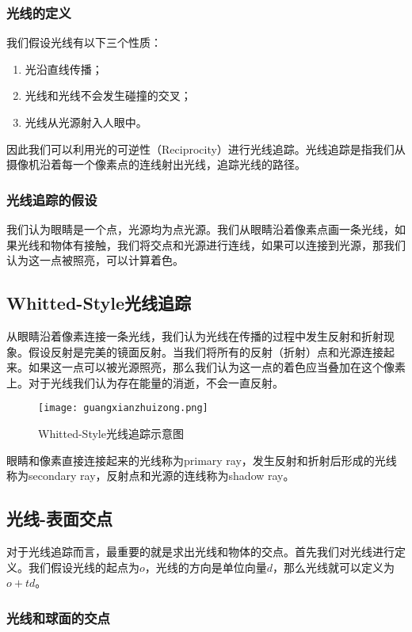 \documentclass[openany]{progbookcn}
\begin{document}
\subsubsection{光线的定义}

我们假设光线有以下三个性质：
\begin{enumerate}
	\item 光沿直线传播；
	\item 光线和光线不会发生碰撞的交叉；
	\item 光线从光源射入人眼中。
\end{enumerate}
因此我们可以利用光的可逆性（Reciprocity）进行光线追踪。光线追踪是指我们从摄像机沿着每一个像素点的连线射出光线，追踪光线的路径。

\subsubsection{光线追踪的假设}
我们认为眼睛是一个点，光源均为点光源。我们从眼睛沿着像素点画一条光线，如果光线和物体有接触，我们将交点和光源进行连线，如果可以连接到光源，那我们认为这一点被照亮，可以计算着色。

\subsection{Whitted-Style光线追踪}
从眼睛沿着像素连接一条光线，我们认为光线在传播的过程中发生反射和折射现象。假设反射是完美的镜面反射。当我们将所有的反射（折射）点和光源连接起来。如果这一点可以被光源照亮，那么我们认为这一点的着色应当叠加在这个像素上。对于光线我们认为存在能量的消逝，不会一直反射。

\begin{figure}[H]
	\centering
	\texttt{[image: guangxianzhuizong.png]}
	\caption{Whitted-Style光线追踪示意图}
	\label{fig:gxzz}
\end{figure}
眼睛和像素直接连接起来的光线称为primary ray，发生反射和折射后形成的光线称为secondary ray，反射点和光源的连线称为shadow ray。

\subsection{光线-表面交点}
对于光线追踪而言，最重要的就是求出光线和物体的交点。首先我们对光线进行定义。我们假设光线的起点为$o$，光线的方向是单位向量$d$，那么光线就可以定义为$o+td$。

\subsubsection{光线和球面的交点}
\end{document}
